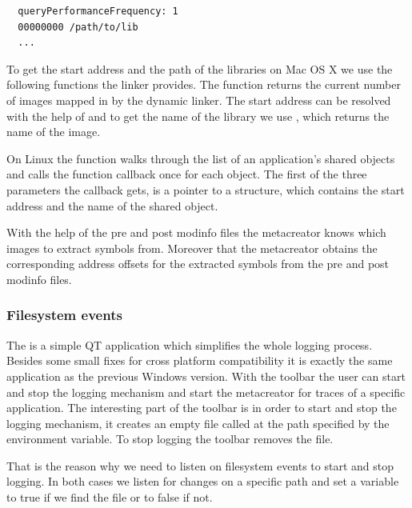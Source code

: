 \begin{verbatim}
  queryPerformanceFrequency: 1
  00000000 /path/to/lib
  ...
\end{verbatim}

To get the start address and the path of the libraries on Mac OS X we use the following functions the linker provides. The function  returns the current number of images mapped in by the dynamic linker. The start address can be resolved with the help of  and to get the name of the library we use , which returns the name of the image.

On Linux the  function walks through the list of an application's shared objects and calls the function callback once for each object. The first of the three parameters the callback gets, is a pointer to a  structure, which contains the start address and the name of the shared object.

With the help of the pre and post modinfo files the metacreator knows which images to extract symbols from. Moreover that the metacreator obtains the corresponding address offsets for the extracted symbols from the pre and post modinfo files.

\subsubsection{Filesystem events}

The  is a simple QT application which simplifies the whole logging process. Besides some small fixes for cross platform compatibility it is exactly the same application as the previous Windows version. With the toolbar the user can start and stop the logging mechanism and start the metacreator for traces of a specific application. The interesting part of the toolbar is in order to start and stop the logging mechanism, it creates an empty file called  at the path specified by the  environment variable. To stop logging the toolbar removes the  file.

That is the reason why we need to listen on filesystem events to start and stop logging. In both cases we listen for changes on a specific path and set a variable to true if we find the  file or to false if not.

